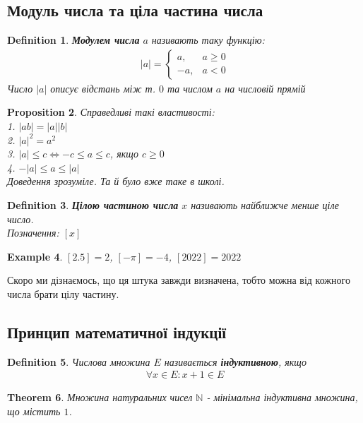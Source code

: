 \documentclass[a4paper, 14pt]{article}
\theoremstyle{theoremdd}
\newtheorem{theorem}{Theorem}[subsection]
\theoremstyle{theoremdd}
\newtheorem{definition}[theorem]{Definition}
\theoremstyle{theoremdd}
\theoremstyle{theoremdd}
\newtheorem{example}[theorem]{Example}
\theoremstyle{theoremdd}
\newtheorem{proposition}[theorem]{Proposition}
\theoremstyle{theoremdd}
\theoremstyle{theoremdd}
\theoremstyle{theoremdd}
\begin{document}
	\subsection*{Модуль числа та ціла частина числа}
	\begin{definition}
	\textbf{Модулем числа} $a$ називають таку функцію:
	\begin{align*}
	|a| = \begin{cases} a, & a \geq 0 \\ -a, & a < 0 \end{cases}
	\end{align*}
	Число $|a|$ описує відстань між т. $0$ та числом $a$ на числовій прямій
	\end{definition}
	
	\begin{proposition}
	Справедливі такі властивості:\\
	1. $|ab| = |a| |b|$\\
	2. $|a|^2 = a^2$\\
	3. $|a| \leq c \iff -c \leq a \leq c$, якщо $c \geq 0$\\
	4. $-|a| \leq a \leq |a|$\\
	\textit{Доведення зрозуміле. Та й було вже таке в школі.}
	\end{proposition}
	
	\begin{definition}
	\textbf{Цілою частиною числа} $x$ називають найближче менше ціле число.\\
	Позначення: $[x]$
	\end{definition}
	
	\begin{example}
	$[2.5] = 2$, $[-\pi] = -4$, $[2022] = 2022$
	\end{example}
	Скоро ми дізнаємось, що ця штука завжди визначена, тобто можна від кожного числа брати цілу частину.
	
	\subsection*{Принцип математичної індукції}
	\begin{definition}
	Числова множина $E$ називається \textbf{індуктивною}, якщо
	\begin{align*}
		\forall x \in E: x+1 \in E
	\end{align*}
	\end{definition}
	
	\begin{theorem}
	Множина натуральних чисел $\mathbb{N}$ - мінімальна індуктивна множина, що містить $1$.
	\end{theorem}
	
\end{document}
